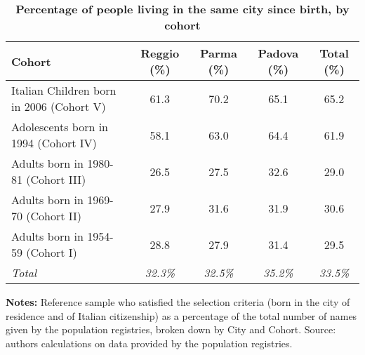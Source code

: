 \begin{table}[ht!]
\caption{\textbf{Percentage of people living in the same city since birth, by cohort}}
\label{tab:SameCity}
\vspace{-5mm}
\begin{center}
\begin{tabular}{ l c c c c }
\hline\hline
\textbf{Cohort} & \textbf{Reggio (\%)} & \textbf{Parma (\%)} & \textbf{Padova (\%)} & \textbf{Total (\%)}\\
\hline
Italian Children born in 2006 (Cohort V)   & 61.3  & 70.2  & 65.1  & 65.2 \\[0.2em]
Adolescents born in 1994 (Cohort IV)       & 58.1  & 63.0  & 64.4  & 61.9 \\[0.2em]
Adults born in 1980-81 (Cohort III)        & 26.5  & 27.5  & 32.6  & 29.0 \\[0.2em]
Adults born in 1969-70 (Cohort II)         & 27.9  & 31.6  & 31.9  & 30.6 \\[0.2em]
Adults born in 1954-59 (Cohort I)          & 28.8  & 27.9  & 31.4  & 29.5 \\[0.2em]
\hline
\textit{Total}         & \textit{32.3\%}  & \textit{32.5\%}  & \textit{35.2\%} & \textit{33.5\%} \\
\hline
\end{tabular}
\end{center}
\footnotesize{{\bfseries Notes:} Reference sample who satisfied the selection criteria (born in the city of residence and of Italian citizenship) as a percentage of the total number of names given by the population registries, broken down by City and Cohort. Source: authors calculations on data provided by the population registries.}
\end{table}
